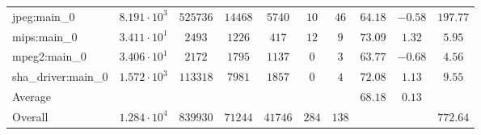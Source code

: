 \begin{tabular}{|l|c|c|c|c|c|c|c|c|c|}
jpeg:main\_0            & $ 8.191 \cdot 10^{3} $ & $ 525736 $ & $ 14468 $ & $ 5740  $ & $ 10  $ & $ 46  $ & $ 64.18       $ & $ -0.58   $ & $ 197.77  $ \\
mips:main\_0            & $ 3.411 \cdot 10^{1} $ & $ 2493   $ & $ 1226  $ & $ 417   $ & $ 12  $ & $ 9   $ & $ 73.09       $ & $ 1.32    $ & $ 5.95    $ \\
mpeg2:main\_0           & $ 3.406 \cdot 10^{1} $ & $ 2172   $ & $ 1795  $ & $ 1137  $ & $ 0   $ & $ 3   $ & $ 63.77       $ & $ -0.68   $ & $ 4.56    $ \\
sha\_driver:main\_0     & $ 1.572 \cdot 10^{3} $ & $ 113318 $ & $ 7981  $ & $ 1857  $ & $ 0   $ & $ 4   $ & $ 72.08       $ & $ 1.13    $ & $ 9.55    $ \\
\hline
Average                 & $                    $ & $        $ & $       $ & $       $ & $     $ & $     $ & $ 68.18       $ & $ 0.13    $ & $         $ \\
\hline
Overall                 & $ 1.284 \cdot 10^{4} $ & $ 839930 $ & $ 71244 $ & $ 41746 $ & $ 284 $ & $ 138 $ & $             $ & $         $ & $ 772.64  $ \\
\hline
\end{tabular}
